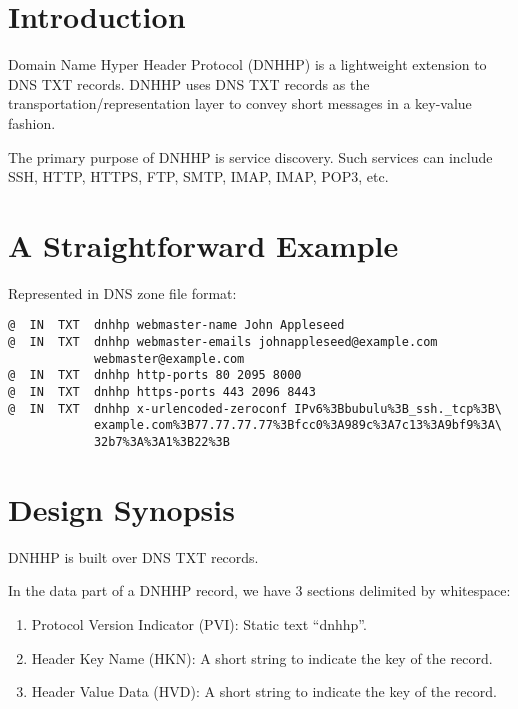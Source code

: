 \documentclass[a4paper,11pt]{article}
\begin{document}

\fulldoctitle


\section*{Introduction}

Domain Name Hyper Header Protocol (DNHHP) is a lightweight extension to DNS TXT records.
DNHHP uses DNS TXT records as the transportation/representation layer to convey short messages in a key-value fashion.

The primary purpose of DNHHP is service discovery.
Such services can include SSH, HTTP, HTTPS, FTP, SMTP, IMAP, IMAP, POP3, etc.

\tableofcontents\clearpage




\section{A Straightforward Example}

Represented in DNS zone file format:

\begin{lstlisting}
@  IN  TXT  dnhhp webmaster-name John Appleseed
@  IN  TXT  dnhhp webmaster-emails johnappleseed@example.com
            webmaster@example.com
@  IN  TXT  dnhhp http-ports 80 2095 8000
@  IN  TXT  dnhhp https-ports 443 2096 8443
@  IN  TXT  dnhhp x-urlencoded-zeroconf IPv6%3Bbubulu%3B_ssh._tcp%3B\
            example.com%3B77.77.77.77%3Bfcc0%3A989c%3A7c13%3A9bf9%3A\
            32b7%3A%3A1%3B22%3B
\end{lstlisting}







\section{Design Synopsis}

DNHHP is built over DNS TXT records.

In the data part of a DNHHP record, we have 3 sections delimited by whitespace:

\begin{enumerate}
	\item Protocol Version Indicator (PVI): Static text ``dnhhp''.
	\item Header Key Name (HKN): A short string to indicate the key of the record.
	\item Header Value Data (HVD): A short string to indicate the key of the record.
\end{enumerate}
\end{document}
